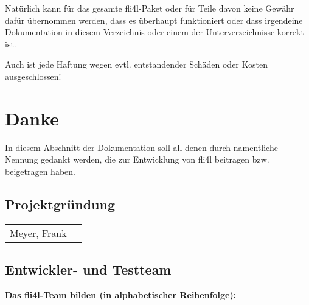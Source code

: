     Natürlich kann für das gesamte fli4l-Paket oder für Teile
    davon keine Gewähr dafür übernommen werden, dass es überhaupt
    funktioniert oder dass irgendeine Dokumentation in diesem
    Verzeichnis oder einem der Unterverzeichnisse korrekt ist.
    
    Auch ist jede Haftung wegen evtl. entstandender Schäden oder 
    Kosten ausgeschlossen!

    \section{Danke}
    \newcommand{\membermail}[3]{\multicolumn{2}{l}{#1 (\emph{#2})}\\\nopagebreak & \email{#3}\\}
    \newcommand{\member}[2]{#1 (\emph{#2})\\}
    \newcommand{\personmail}[2]{#1 & \email{#2}\\}
    \newcommand{\person}[1]{#1\\}
    
    In diesem Abschnitt der Dokumentation soll all denen durch namentliche Nennung
    gedankt werden, die zur Entwicklung von fli4l beitragen bzw. beigetragen haben.

    \subsection{Projektgründung}
    
    \begin{tabular}{ll}
      \person{Meyer, Frank}
    \end{tabular}\latex{\\}

    \noindent{}
  
    \subsection {Entwickler- und Testteam}

    \noindent \textbf{Das fli4l-Team bilden (in alphabetischer Reihenfolge):}

